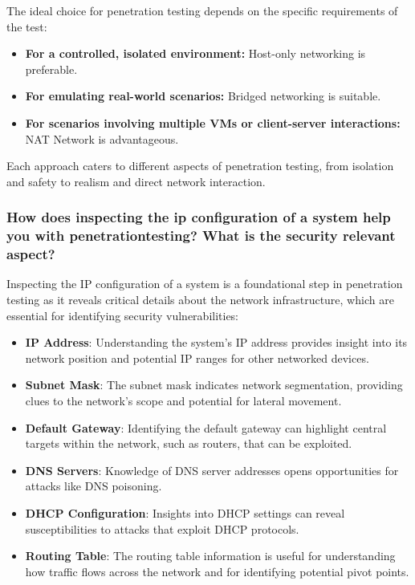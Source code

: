 The ideal choice for penetration testing depends on the specific requirements of the test:

\begin{itemize}
    \item \textbf{For a controlled, isolated environment:} Host-only networking is preferable.
    \item \textbf{For emulating real-world scenarios:} Bridged networking is suitable.
    \item \textbf{For scenarios involving multiple VMs or client-server interactions:} NAT Network is advantageous.
\end{itemize}

Each approach caters to different aspects of penetration testing, from isolation and safety to realism and direct network interaction.







\subsubsection{How does inspecting the ip configuration of a system help you with penetrationtesting? What is the security relevant aspect?}
Inspecting the IP configuration of a system is a foundational step in penetration testing as it reveals critical details about the network infrastructure, which are essential for identifying security vulnerabilities:

\begin{itemize}
    \item \textbf{IP Address}: Understanding the system's IP address provides insight into its network position and potential IP ranges for other networked devices.
    \item \textbf{Subnet Mask}: The subnet mask indicates network segmentation, providing clues to the network's scope and potential for lateral movement.
    \item \textbf{Default Gateway}: Identifying the default gateway can highlight central targets within the network, such as routers, that can be exploited.
    \item \textbf{DNS Servers}: Knowledge of DNS server addresses opens opportunities for attacks like DNS poisoning.
    \item \textbf{DHCP Configuration}: Insights into DHCP settings can reveal susceptibilities to attacks that exploit DHCP protocols.
    \item \textbf{Routing Table}: The routing table information is useful for understanding how traffic flows across the network and for identifying potential pivot points.
\end{itemize}

